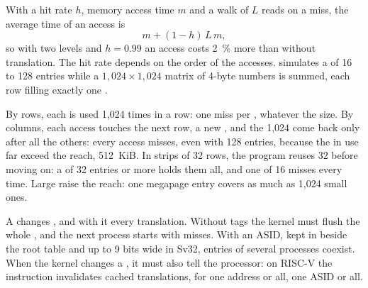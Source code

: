 With a  hit rate $h$, memory access time $m$ and a walk of $L$ reads on a miss, the average time of an access is
\[ m + (1 - h)\, L\, m, \]
so with two levels and $h = 0.99$ an access costs 2~\% more than without translation. The hit rate depends on the order of the accesses.  simulates a  of 16 to 128 entries while a $1{,}024 \times 1{,}024$ matrix of 4-byte numbers is summed, each row filling exactly one .

\label{lst:b3:virtual-memory:tlb}

\label{out:b3:virtual-memory:tlb}

By rows, each  is used 1,024 times in a row: one miss per , whatever the size. By columns, each access touches the next row, a new , and the 1,024  come back only after all the others: every access misses, even with 128 entries, because the  in use far exceed the reach, 512~KiB. In strips of 32 rows, the program reuses 32  before moving on: a  of 32 entries or more holds them all, and one of 16 misses every time. Large  raise the reach: one megapage entry covers as much as 1,024 small ones.

A  changes , and with it every translation. Without tags the kernel must flush the whole , and the next process starts with misses. With an ASID, kept in  beside the root table and up to 9 bits wide in Sv32, entries of several processes coexist. %
When the kernel changes a , it must also tell the processor: on RISC-V the instruction  invalidates cached translations, for one address or all, one ASID or all. %

